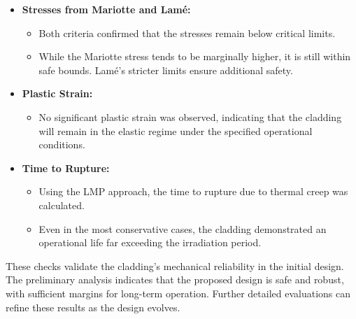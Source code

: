\begin{itemize}
    \item \textbf{Stresses from Mariotte and Lamé:}
    \begin{itemize}
        \item Both criteria confirmed that the stresses remain below critical limits.
        \item While the Mariotte stress tends to be marginally higher, it is still within safe bounds. Lamé's stricter limits ensure additional safety.
    \end{itemize}

    \item \textbf{Plastic Strain:}
    \begin{itemize}
        \item No significant plastic strain was observed, indicating that the cladding will remain in the elastic regime under the specified operational conditions.
    \end{itemize}

    \item \textbf{Time to Rupture:}
    \begin{itemize}
        \item Using the LMP approach, the time to rupture due to thermal creep was calculated.
        \item Even in the most conservative cases, the cladding demonstrated an operational life far exceeding the irradiation period.
    \end{itemize}
\end{itemize}

These checks validate the cladding's mechanical reliability in the initial design. The preliminary analysis indicates that the proposed design is safe and robust, with sufficient margins for long-term operation. Further detailed evaluations can refine these results as the design evolves.
